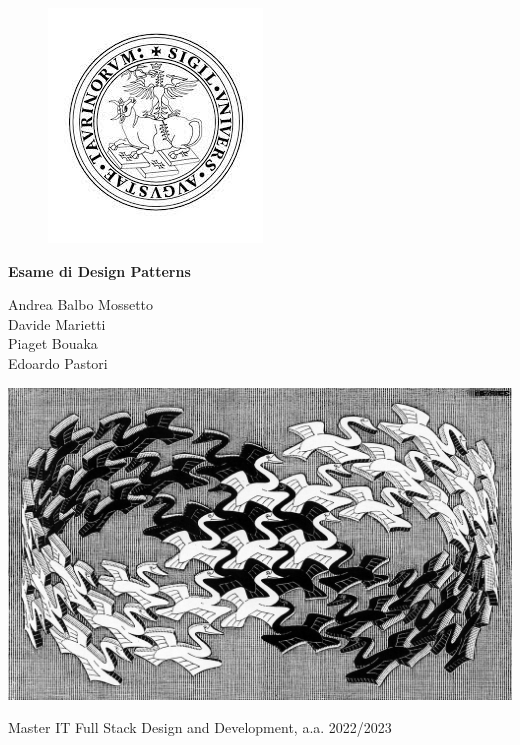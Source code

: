 \documentclass[12pt]{article}
\begin{document}

\begin{figure}
    \centering
    \includegraphics[width=0.2\linewidth]{images/unito_logo.jpg}
\end{figure}

\begin{center}
    \vspace{5ex}
    {\huge \textbf{Esame di Design Patterns}}
    \vspace{5ex}
\end{center}

\begin{center}
    Andrea Balbo Mossetto \\
    Davide Marietti \\
    Piaget Bouaka \\
    Edoardo Pastori
\end{center}

\vspace{10ex}

\begin{center}

\includegraphics[scale=2]{design_pattern.jpeg}

\vspace{20ex}

Master IT Full Stack Design and Development, a.a. 2022/2023

\end{center}
\end{document}
